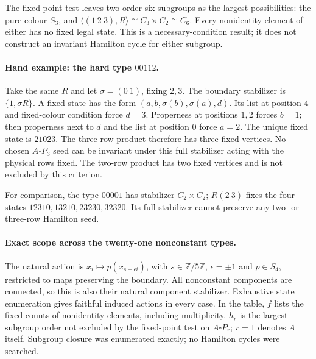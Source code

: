 \documentclass[11pt]{article}
\begin{document}
The fixed-point test leaves two order-six subgroups as the largest
possibilities: the pure colour $S_3$, and
$\langle(1\ 2\ 3),R\rangle\cong C_3\times C_2\cong C_6$.
Every nonidentity element of either has no fixed legal state.
This is a necessary-condition result; it does not construct an invariant
Hamilton cycle for either subgroup.

\paragraph{Hand example: the hard type $00112$.}
Take the same $R$ and let $\sigma=(0\ 1)$, fixing $2,3$.
The boundary stabilizer is $\{1,\sigma R\}$. A fixed state has the form
$(a,b,\sigma(b),\sigma(a),d)$. Its list at position $4$ and fixed-colour
condition force $d=3$. Properness at positions $1,2$ forces $b=1$;
then properness next to $d$ and the list at position $0$ force $a=2$.
The unique fixed state is $21023$.
The three-row product therefore has three fixed vertices. No chosen
$A\square P_3$ seed can be invariant under this full stabilizer acting
with the physical rows fixed. The two-row product has two fixed vertices
and is not excluded by this criterion.

For comparison, the type $00001$ has stabilizer $C_2\times C_2$;
$R(2\ 3)$ fixes the four states
$12310,13210,23230,32320$. Its full stabilizer cannot preserve any
two- or three-row Hamilton seed.

\paragraph{Exact scope across the twenty-one nonconstant types.}
The natural action is
$x_i\mapsto p(x_{s+\epsilon i})$, with $s\in\mathbb Z/5\mathbb Z$,
$\epsilon=\pm1$ and $p\in S_4$, restricted to maps preserving the
boundary. All nonconstant components are connected, so this is also
their natural component stabilizer. Exhaustive state enumeration gives
faithful induced actions in every case. In the table, $f$ lists the
fixed counts of nonidentity elements, including multiplicity.
$h_r$ is the largest subgroup order not excluded by the fixed-point
test on $A\square P_r$; $r=1$ denotes $A$ itself. Subgroup closure
was enumerated exactly; no Hamilton cycles were searched.
\end{document}
